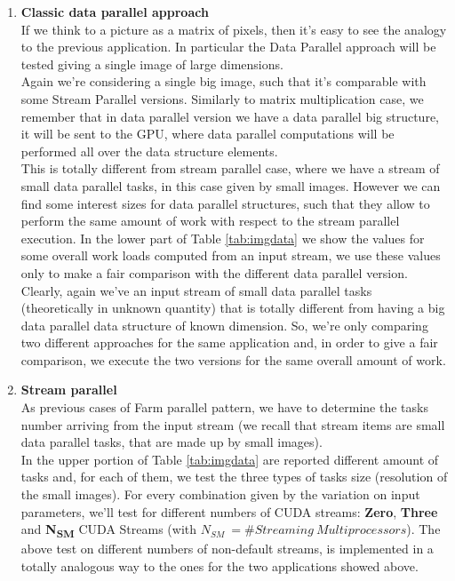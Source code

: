 %
\begin{enumerate}
	\item \textbf{Classic data parallel approach}\\
	If we think to a picture as a matrix of pixels, then it's easy to see the analogy to the previous application.
	In particular the Data Parallel approach will be tested giving a single image of large dimensions.\\
	Again we're considering a single big image, such that it's comparable with some Stream Parallel versions. Similarly to matrix multiplication case, we remember that in data parallel version we have a data parallel big structure, it will be sent to the GPU, where data parallel computations will be performed all over the data structure elements.\\
	This is totally different from stream parallel case, where we have a stream of small data parallel tasks, in this case given by small images.
	However we can find some interest sizes for data parallel structures, such that they allow to perform the same amount of work with respect to the stream parallel execution.
	In the lower part of Table \ref{tab:imgdata} we show the values for some overall work loads computed from an input stream, we use these values only to make a fair comparison with the different data parallel version.\\
	Clearly, again we've an input stream of small data parallel tasks (theoretically in unknown quantity) that is totally different from having a big data parallel data structure of known dimension.
	So, we're only comparing two different approaches for the same application and, in order to give a fair comparison, we execute the two versions for the same overall amount of work.
	
	\item \textbf{Stream parallel}\\	
	As previous cases of Farm parallel pattern, we have to determine the tasks number arriving from the input stream (we recall that stream items are small data parallel tasks, that are made up by small images).\\
	In the upper portion of Table \ref{tab:imgdata} are reported different amount of tasks and, for each of them, we test the three types of tasks size (resolution of the small images).
	For every combination given by the variation on input parameters, we'll test for different numbers of CUDA streams: \textbf{Zero}, \textbf{Three} and \textbf{N\textsubscript{SM}} CUDA Streams (with \(N_{SM} \ =\# Streaming \ Multiprocessors\)).
	The above test on different numbers of non-default streams, is implemented in a totally analogous way to the ones for the two applications showed above.	
\end{enumerate}



